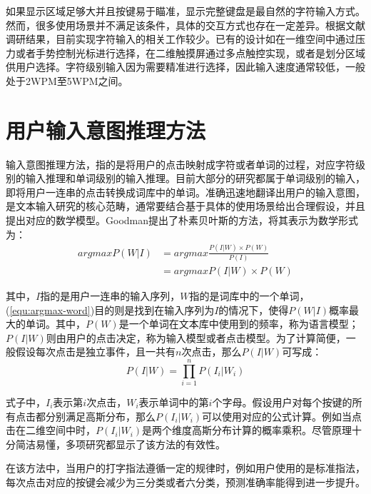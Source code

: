 如果显示区域足够大并且按键易于瞄准，显示完整键盘是最自然的字符输入方式。然而，很多使用场景并不满足该条件，具体的交互方式也存在一定差异。根据文献调研结果，目前实现字符输入的相关工作较少。已有的设计如在一维空间中通过压力\cite{2018forceboard}或者手势\cite{1dhandwriting}控制光标进行选择，在二维触摸屏通过多点触控实现\cite{bonner2010no}，或者是划分区域供用户选择\cite{banovic2013escape}。字符级别输入因为需要精准进行选择，因此输入速度通常较低，一般处于2WPM至5WPM之间。

\section{用户输入意图推理方法}
输入意图推理方法，指的是将用户的点击映射成字符或者单词的过程，对应字符级别的输入推理和单词级别的输入推理。目前大部分的研究都属于单词级别的输入，即将用户一连串的点击转换成词库中的单词。准确迅速地翻译出用户的输入意图，是文本输入研究的核心范畴，通常要结合基于具体的使用场景给出合理假设，并且提出对应的数学模型。Goodman\cite{language2002goodman}提出了朴素贝叶斯的方法，将其表示为数学形式为：
\begin{equation}
    \label{equ:argmax-word}
    \begin{aligned}
    argmax P(W|I) &= argmax \frac{P(I|W) \times P(W)}{P(I)} \\
                  &= argmax P(I|W) \times P(W)
    \end{aligned}
\end{equation}

其中，$I$指的是用户一连串的输入序列，$W$指的是词库中的一个单词，(\ref{equ:argmax-word})目的则是找到在输入序列为$I$的情况下，使得$P(W|I)$概率最大的单词。其中，$P(W)$是一个单词在文本库中使用到的频率，称为语言模型；$P(I|W)$则由用户的点击决定，称为输入模型或者点击模型。为了计算简便，一般假设每次点击是独立事件，且一共有$n$次点击，那么$P(I|W)$可写成：
\begin{equation}
    P(I|W) = \prod_{i=1}^{n}P(I_i|W_i)
\end{equation}

式子中，$I_i$表示第$i$次点击，$W_i$表示单词中的第$i$个字母。假设用户对每个按键的所有点击都分别满足高斯分布，那么$P(I_i|W_i)$可以使用对应的公式计算。例如当点击在二维空间中时，$P(I_i|W_i)$是两个维度高斯分布计算的概率乘积。尽管原理十分简洁易懂，多项研究\cite{2017blindtype}\cite{2015atk}\cite{2018forceboard}都显示了该方法的有效性。

在该方法中，当用户的打字指法遵循一定的规律时，例如用户使用的是标准指法\cite{2015atk}，每次点击对应的按键会减少为三分类或者六分类，预测准确率能得到进一步提升。

